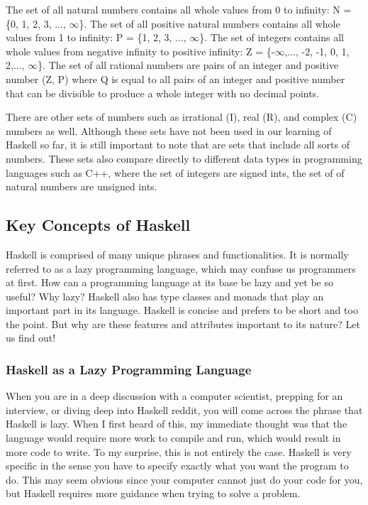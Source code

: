 \documentclass{article}
\begin{document}
\medskip\noindent
The set of all natural numbers contains all whole values from 0 to infinity: N = \{0, 1, 2, 3, ..., $\infty$\}. The set of all positive natural numbers contains all whole values from 1 to infinity: P = \{1, 2, 3, ..., $\infty$\}. The set of integers contains all whole values from negative infinity to positive infinity: Z = \{-$\infty$,..., -2, -1, 0, 1, 2,..., $\infty$\}. The set of all rational numbers are pairs of an integer and positive number (Z, P) where Q is equal to all pairs of an integer and positive number that can be divisible to produce a whole integer with no decimal points. 

\medskip\noindent
There are other sets of numbers such as irrational (I), real (R), and complex (C) numbers as well. Although these sets have not been used in our learning of Haskell so far, it is still important to note that are sets that include all sorts of numbers. These sets also compare directly to different data types in programming languages such as C++, where the set of integers are signed ints, the set of of natural numbers are unsigned ints. 

\subsection{Key Concepts of Haskell}

Haskell is comprised of many unique phrases and functionalities. It is normally referred to as a lazy programming language, which may confuse us programmers at first. How can a programming language at its base be lazy and yet be so useful? Why lazy? Haskell also has type classes and monads that play an important part in its language. Haskell is concise and prefers to be short and too the point. But why are these features and attributes important to its nature? Let us find out!

\subsubsection{Haskell as a Lazy Programming Language}

When you are in a deep discussion with a computer scientist, prepping for an interview, or diving deep into Haskell reddit, you will come across the phrase that Haskell is lazy. When I first heard of this, my immediate thought was that the language would require more work to compile and run, which would result in more code to write. To my surprise, this is not entirely the case. Haskell is very specific in the sense you have to specify exactly what you want the program to do. This may seem obvious since your computer cannot just do your code for you, but Haskell requires more guidance when trying to solve a problem. 
\end{document}
